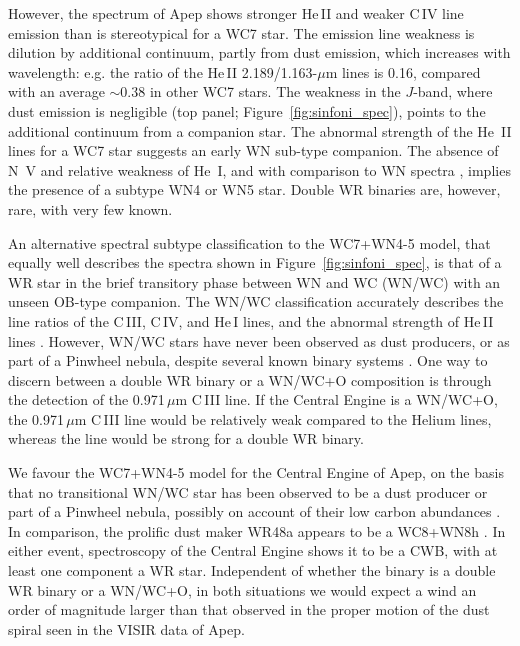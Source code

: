 \documentclass[preprint,times]{aastex61}
\begin{document}
However, the spectrum of Apep shows stronger He\,II and weaker C\,IV line emission than is stereotypical for a WC7 star. The emission line weakness is dilution by additional continuum, partly from dust emission, which increases with wavelength: e.g. the ratio of the He\,II 2.189/1.163-$\mu$m lines is 0.16, compared with an average $\sim 0.38$ in other WC7 stars. The weakness in the $J$-band, where dust emission is negligible (top panel; Figure~\ref{fig:sinfoni_spec}), points to the additional continuum from a companion star. The abnormal strength of the He~II lines for a WC7 star suggests an early WN sub-type companion. The absence of N~V and relative weakness of He~I, and with comparison to WN spectra \citep{1996A&A...305..541C}, implies the presence of a subtype WN4 or WN5 star. Double WR binaries are, however, rare, with very few known\citep{2004ApJ...611L..33B}.

An alternative spectral subtype classification to the WC7+WN4-5 model, that equally well describes the spectra shown in Figure~\ref{fig:sinfoni_spec}, is that of a WR star in the brief transitory phase between WN and WC (WN/WC) with an unseen OB-type companion. The WN/WC classification accurately describes the line ratios of the C\,III, C\,IV, and He\,I lines, and the abnormal strength of He\,II lines \citep{2018MNRAS.473.2853R}. However, WN/WC stars have never been observed as dust producers, or as part of a Pinwheel nebula, despite several known binary systems \citep{1989ApJ...344..870M,2009MNRAS.399.1977M}. One way to discern between a double WR binary or a WN/WC+O composition is through the detection of the 0.971\,$\mu$m C\,III line. If the Central Engine is a WN/WC+O, the 0.971\,$\mu$m C\,III line would be relatively weak compared to the Helium lines, whereas the line would be strong for a double WR binary.

We favour the WC7+WN4-5 model for the Central Engine of Apep, on the basis that no transitional WN/WC star has been observed to be a dust producer or part of a Pinwheel nebula, possibly on account of their low carbon abundances \citep{2012A&A...540A.144S}. In comparison, the prolific dust maker WR48a \citep{2012MNRAS.420.2526W} appears to be a WC8+WN8h \citep{2014MNRAS.445.1663Z}. In either event, spectroscopy of the Central Engine shows it to be a CWB, with at least one component a WR star. Independent of whether the binary is a double WR binary or a WN/WC+O, in both situations we would expect a wind an order of magnitude larger than that observed in the proper motion of the dust spiral seen in the VISIR data of Apep.
\end{document}
